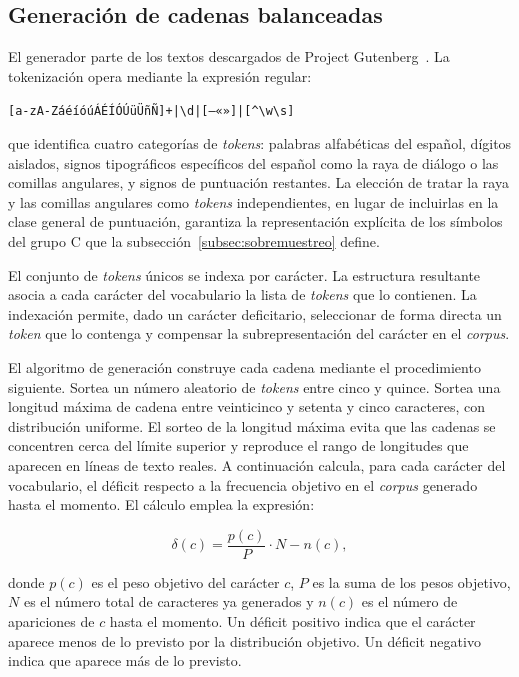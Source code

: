 \subsection{Generación de cadenas balanceadas}
\label{subsec:cadenas-balanceadas}

El generador parte de los textos descargados de Project Gutenberg~\cite{gutenberg}. La tokenización opera mediante la expresión regular:
\begin{center}
	\verb![a-zA-ZáéíóúÁÉÍÓÚüÜñÑ]+|\d|[—«»]|[^\w\s]!
\end{center}
que identifica cuatro categorías de \textit{tokens}: palabras alfabéticas del español, dígitos aislados, signos tipográficos específicos del español como la raya de diálogo o las comillas angulares, y signos de puntuación restantes. La elección de tratar la raya y las comillas angulares como \textit{tokens} independientes, en lugar de incluirlas en la clase general de puntuación, garantiza la representación explícita de los símbolos del grupo C que la subsección~\ref{subsec:sobremuestreo} define.

El conjunto de \textit{tokens} únicos se indexa por carácter. La estructura resultante asocia a cada carácter del vocabulario la lista de \textit{tokens} que lo contienen. La indexación permite, dado un carácter deficitario, seleccionar de forma directa un \textit{token} que lo contenga y compensar la subrepresentación del carácter en el \textit{corpus}.

El algoritmo de generación construye cada cadena mediante el procedimiento siguiente. Sortea un número aleatorio de \textit{tokens} entre cinco y quince. Sortea una longitud máxima de cadena entre veinticinco y setenta y cinco caracteres, con distribución uniforme. El sorteo de la longitud máxima evita que las cadenas se concentren cerca del límite superior y reproduce el rango de longitudes que aparecen en líneas de texto reales. A continuación calcula, para cada carácter del vocabulario, el déficit respecto a la frecuencia objetivo en el \textit{corpus} generado hasta el momento. El cálculo emplea la expresión:

\begin{equation}
	\delta(c) = \frac{p(c)}{P} \cdot N - n(c),
	\label{eq:deficit}
\end{equation}

donde $p(c)$ es el peso objetivo del carácter $c$, $P$ es la suma de los pesos objetivo, $N$ es el número total de caracteres ya generados y $n(c)$ es el número de apariciones de $c$ hasta el momento. Un déficit positivo indica que el carácter aparece menos de lo previsto por la distribución objetivo. Un déficit negativo indica que aparece más de lo previsto.

